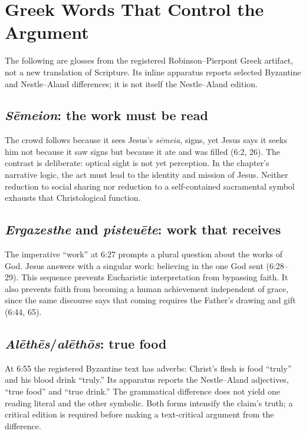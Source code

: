 \section{Greek Words That Control the Argument}

The following are glosses from the registered Robinson--Pierpont Greek
artifact, not a new translation of Scripture. Its inline apparatus reports
selected Byzantine and Nestle--Aland differences; it is not itself the
Nestle--Aland edition.

\subsection{\emph{S\=emeion}: the work must be read}

The crowd follows because it sees Jesus's \emph{s\=emeia}, signs, yet Jesus says
it seeks him not because it saw signs but because it ate and was filled
(6:2, 26). The contrast is deliberate: optical sight is not yet perception.
In the chapter's narrative logic, the act must lead to the identity and
mission of Jesus. Neither reduction to social sharing nor reduction to a
self-contained sacramental symbol exhausts that Christological function.

\subsection{\emph{Ergazesthe} and \emph{pisteu\=ete}: work that receives}

The imperative ``work'' at 6:27 prompts a plural question about the works of
God. Jesus answers with a singular work: believing in the one God sent
(6:28--29). This sequence prevents Eucharistic interpretation from bypassing
faith. It also prevents faith from becoming a human achievement independent of
grace, since the same discourse says that coming requires the Father's drawing
and gift (6:44, 65).

\subsection{\emph{Al\=eth\=es}/\emph{al\=eth\=os}: true food}

At 6:55 the registered Byzantine text has adverbs: Christ's flesh is food
``truly'' and his blood drink ``truly.'' Its apparatus reports the
Nestle--Aland adjectives, ``true food'' and ``true drink.'' The grammatical
difference does not yield one reading literal and the other symbolic. Both
forms intensify the claim's truth; a critical edition is required before
making a text-critical argument from the difference.

